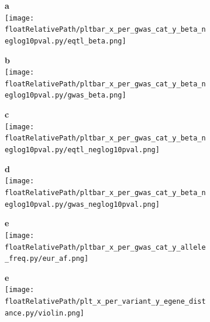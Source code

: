 \begin{figure}[!ht]

    \begin{subfigure}[]{.49\textwidth}
        \textbf{a}
        \\
        \texttt{[image: \\floatRelativePath/pltbar\_x\_per\_gwas\_cat\_y\_beta\_neglog10pval.py/eqtl\_beta.png]}
    \end{subfigure}
    \begin{subfigure}[]{.49\textwidth}
        \textbf{b}
        \\
        \texttt{[image: \\floatRelativePath/pltbar\_x\_per\_gwas\_cat\_y\_beta\_neglog10pval.py/gwas\_beta.png]}
    \end{subfigure}

    \begin{subfigure}[]{.49\textwidth}
        \textbf{c}
        \\
        \texttt{[image: \\floatRelativePath/pltbar\_x\_per\_gwas\_cat\_y\_beta\_neglog10pval.py/eqtl\_neglog10pval.png]}
    \end{subfigure}
    \begin{subfigure}[]{.49\textwidth}
        \textbf{d}
        \\
        \texttt{[image: \\floatRelativePath/pltbar\_x\_per\_gwas\_cat\_y\_beta\_neglog10pval.py/gwas\_neglog10pval.png]}
    \end{subfigure}

    \centering
    \begin{subfigure}[]{.49\textwidth}
        \textbf{e}
        \\
        \texttt{[image: \\floatRelativePath/pltbar\_x\_per\_gwas\_cat\_y\_allele\_freq.py/eur\_af.png]}
    \end{subfigure}
    \begin{subfigure}[]{.49\textwidth}
        \textbf{e}
        \\
        \texttt{[image: \\floatRelativePath/plt\_x\_per\_variant\_y\_egene\_distance.py/violin.png]}
    \end{subfigure}

    \caption{}

\end{figure}

